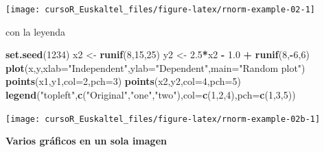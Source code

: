 \documentclass[]{book}
\newenvironment{Shaded}{\begin{snugshade}}{\end{snugshade}}
\newcommand{\KeywordTok}[1]{\textcolor[rgb]{0.13,0.29,0.53}{\textbf{#1}}}
\newcommand{\DataTypeTok}[1]{\textcolor[rgb]{0.13,0.29,0.53}{#1}}
\newcommand{\DecValTok}[1]{\textcolor[rgb]{0.00,0.00,0.81}{#1}}
\newcommand{\FloatTok}[1]{\textcolor[rgb]{0.00,0.00,0.81}{#1}}
\newcommand{\StringTok}[1]{\textcolor[rgb]{0.31,0.60,0.02}{#1}}
\newcommand{\OperatorTok}[1]{\textcolor[rgb]{0.81,0.36,0.00}{\textbf{#1}}}
\newcommand{\NormalTok}[1]{#1}
\begin{document}
\begin{center}\texttt{[image: cursoR\_Euskaltel\_files/figure-latex/rnorm-example-02-1]} \end{center}

con la leyenda

\begin{Shaded}
\begin{Highlighting}[]
\KeywordTok{set.seed}\NormalTok{(}\DecValTok{1234}\NormalTok{)}
\NormalTok{x2 <-}\StringTok{ }\KeywordTok{runif}\NormalTok{(}\DecValTok{8}\NormalTok{,}\DecValTok{15}\NormalTok{,}\DecValTok{25}\NormalTok{)}
\NormalTok{y2 <-}\StringTok{ }\FloatTok{2.5}\OperatorTok{*}\NormalTok{x2 }\OperatorTok{-}\StringTok{ }\FloatTok{1.0} \OperatorTok{+}\StringTok{ }\KeywordTok{runif}\NormalTok{(}\DecValTok{8}\NormalTok{,}\OperatorTok{-}\DecValTok{6}\NormalTok{,}\DecValTok{6}\NormalTok{)}
 \KeywordTok{plot}\NormalTok{(x,y,}\DataTypeTok{xlab=}\StringTok{"Independent"}\NormalTok{,}\DataTypeTok{ylab=}\StringTok{"Dependent"}\NormalTok{,}\DataTypeTok{main=}\StringTok{"Random plot"}\NormalTok{)}
 \KeywordTok{points}\NormalTok{(x1,y1,}\DataTypeTok{col=}\DecValTok{2}\NormalTok{,}\DataTypeTok{pch=}\DecValTok{3}\NormalTok{)}
 \KeywordTok{points}\NormalTok{(x2,y2,}\DataTypeTok{col=}\DecValTok{4}\NormalTok{,}\DataTypeTok{pch=}\DecValTok{5}\NormalTok{)}
 \KeywordTok{legend}\NormalTok{(}\StringTok{"topleft"}\NormalTok{,}\KeywordTok{c}\NormalTok{(}\StringTok{"Original"}\NormalTok{,}\StringTok{"one"}\NormalTok{,}\StringTok{"two"}\NormalTok{),}\DataTypeTok{col=}\KeywordTok{c}\NormalTok{(}\DecValTok{1}\NormalTok{,}\DecValTok{2}\NormalTok{,}\DecValTok{4}\NormalTok{),}\DataTypeTok{pch=}\KeywordTok{c}\NormalTok{(}\DecValTok{1}\NormalTok{,}\DecValTok{3}\NormalTok{,}\DecValTok{5}\NormalTok{))}
\end{Highlighting}
\end{Shaded}

\begin{center}\texttt{[image: cursoR\_Euskaltel\_files/figure-latex/rnorm-example-02b-1]} \end{center}

\textbf{Varios gráficos en un sola imagen}
\end{document}
